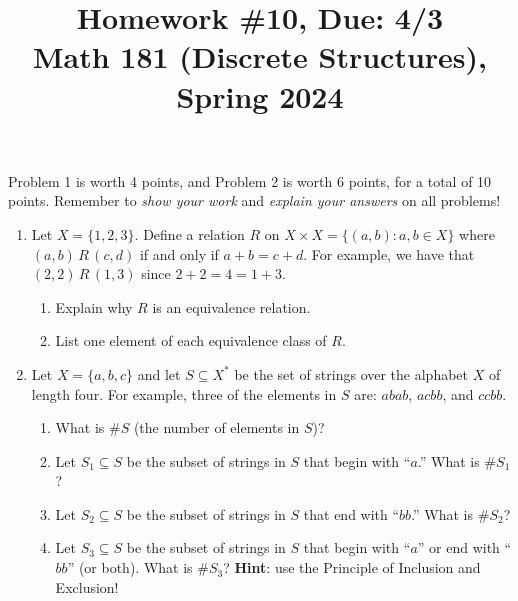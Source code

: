 \documentclass[11pt]{article}
\title{Homework \#10, Due: 4/3 \\Math 181 (Discrete Structures), Spring 2024}
\date{}
\begin{document}
\maketitle

\thispagestyle{empty}

\vspace{-1cm}

Problem 1 is worth 4 points, and Problem 2 is worth 6 points, for a total of 10 points. Remember to \emph{show your work} and \emph{explain your answers} on all problems!

\begin{enumerate}

\item Let $X= \{1,2,3\}$. Define a relation $R$ on $X \times X = \{(a,b)\colon a, b\in X\}$ where $(a,b) \, R \, (c,d)$ if and only if $a+b = c+d$. For example, we have that $(2,2) \, R \, (1,3)$ since $2+2=4=1+3$.
\begin{enumerate}
\item Explain why $R$ is an equivalence relation.
\item List one element of each equivalence class of $R$.
\end{enumerate}

\item Let $X = \{a,b,c\}$ and let $S\subseteq X^{*}$ be the set of strings over the alphabet $X$ of length four. For example, three of the elements in $S$ are: $abab$, $acbb$, and $ccbb$.
\begin{enumerate}
\item What is $\#S $ (the number of elements in $S$)?
\item Let $S_1 \subseteq S$ be the subset of strings in $S$ that begin with ``$a$.'' What is $\#S_1$?
\item Let $S_2 \subseteq S$ be the subset of strings in $S$ that end with ``$bb$.'' What is $\#S_2$?
\item Let $S_3 \subseteq S$ be the subset of strings in $S$ that begin with ``$a$'' or end with ``$bb$'' (or both). What is $\#S_3$? {\bf Hint}: use the Principle of Inclusion and Exclusion!
\end{enumerate}

\end{enumerate}
\end{document}

